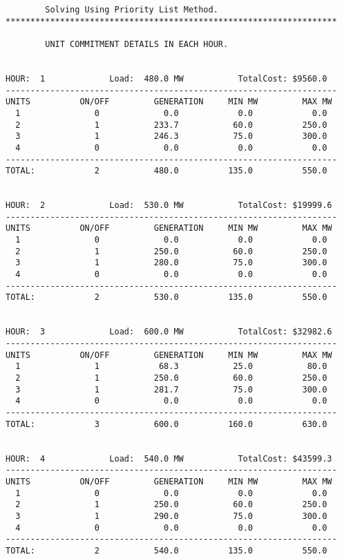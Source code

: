 \begin{verbatim}
		Solving Using Priority List Method.
*******************************************************************

		UNIT COMMITMENT DETAILS IN EACH HOUR.


HOUR:  1             Load:  480.0 MW           TotalCost: $9560.0
-------------------------------------------------------------------
UNITS          ON/OFF         GENERATION     MIN MW         MAX MW
  1               0             0.0            0.0            0.0
  2               1           233.7           60.0          250.0
  3               1           246.3           75.0          300.0
  4               0             0.0            0.0            0.0
-------------------------------------------------------------------
TOTAL:            2           480.0          135.0          550.0


HOUR:  2             Load:  530.0 MW           TotalCost: $19999.6
-------------------------------------------------------------------
UNITS          ON/OFF         GENERATION     MIN MW         MAX MW
  1               0             0.0            0.0            0.0
  2               1           250.0           60.0          250.0
  3               1           280.0           75.0          300.0
  4               0             0.0            0.0            0.0
-------------------------------------------------------------------
TOTAL:            2           530.0          135.0          550.0


HOUR:  3             Load:  600.0 MW           TotalCost: $32982.6
-------------------------------------------------------------------
UNITS          ON/OFF         GENERATION     MIN MW         MAX MW
  1               1            68.3           25.0           80.0
  2               1           250.0           60.0          250.0
  3               1           281.7           75.0          300.0
  4               0             0.0            0.0            0.0
-------------------------------------------------------------------
TOTAL:            3           600.0          160.0          630.0


HOUR:  4             Load:  540.0 MW           TotalCost: $43599.3
-------------------------------------------------------------------
UNITS          ON/OFF         GENERATION     MIN MW         MAX MW
  1               0             0.0            0.0            0.0
  2               1           250.0           60.0          250.0
  3               1           290.0           75.0          300.0
  4               0             0.0            0.0            0.0
-------------------------------------------------------------------
TOTAL:            2           540.0          135.0          550.0



\end{verbatim}
